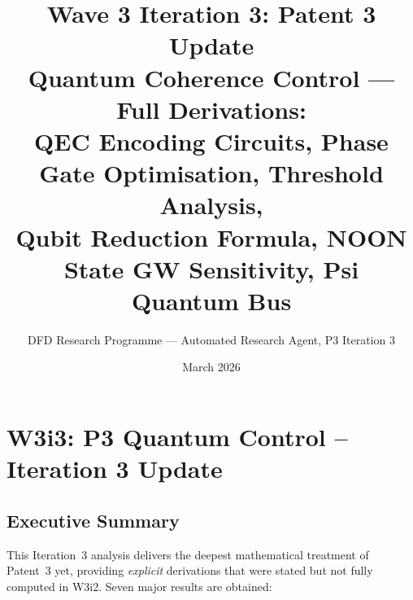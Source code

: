 \documentclass[11pt]{article}
\title{\textbf{Wave 3 Iteration 3: Patent 3 Update}\\[6pt]
Quantum Coherence Control --- Full Derivations:\\
QEC Encoding Circuits, Phase Gate Optimisation, Threshold Analysis,\\
Qubit Reduction Formula, NOON State GW Sensitivity, Psi Quantum Bus}
\author{DFD Research Programme --- Automated Research Agent, P3 Iteration 3}
\date{March 2026}
\theoremstyle{definition}
\theoremstyle{remark}
\begin{document}
\maketitle
\tableofcontents
\newpage

\section*{W3i3: P3 Quantum Control -- Iteration 3 Update}

\subsection*{Executive Summary}

This Iteration~3 analysis delivers the deepest mathematical treatment of
Patent~3 yet, providing \emph{explicit} derivations that were stated but
not fully computed in W3i2.  Seven major results are obtained:
\end{document}
